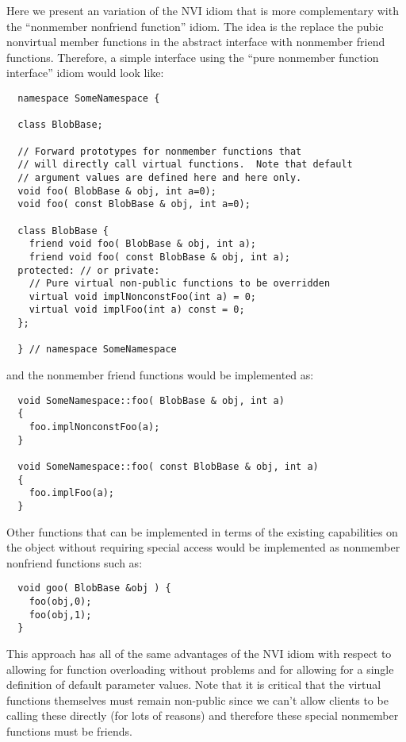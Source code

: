 \documentclass[pdf,ps2pdf,11pt]{SANDreport}
\begin{document}
Here we present an variation of the NVI idiom that is more complementary with
the ``nonmember nonfriend function'' idiom.  The idea is the replace the pubic
nonvirtual member functions in the abstract interface with nonmember friend
functions.  Therefore, a simple interface using the ``pure nonmember function
interface'' idiom would look like:

{\small\begin{verbatim}
  namespace SomeNamespace {

  class BlobBase;

  // Forward prototypes for nonmember functions that
  // will directly call virtual functions.  Note that default
  // argument values are defined here and here only.
  void foo( BlobBase & obj, int a=0);
  void foo( const BlobBase & obj, int a=0);

  class BlobBase {
    friend void foo( BlobBase & obj, int a);
    friend void foo( const BlobBase & obj, int a);
  protected: // or private:
    // Pure virtual non-public functions to be overridden
    virtual void implNonconstFoo(int a) = 0;
    virtual void implFoo(int a) const = 0;
  };

  } // namespace SomeNamespace
\end{verbatim}}

{}\noindent{}and the nonmember friend functions would be implemented as:

{\small\begin{verbatim}
  void SomeNamespace::foo( BlobBase & obj, int a)
  {
    foo.implNonconstFoo(a);
  }

  void SomeNamespace::foo( const BlobBase & obj, int a)
  {
    foo.implFoo(a);
  }
\end{verbatim}}

Other functions that can be implemented in terms of the existing capabilities
on the object without requiring special access would be implemented as
nonmember nonfriend functions such as:

{\small\begin{verbatim}
  void goo( BlobBase &obj ) {
    foo(obj,0);
    foo(obj,1);
  }
\end{verbatim}}

This approach has all of the same advantages of the NVI idiom with respect to
allowing for function overloading without problems and for allowing
for a single definition of default parameter values.  Note that it is critical
that the virtual functions themselves must remain non-public since we can't
allow clients to be calling these directly (for lots of reasons) and therefore
these special nonmember functions must be friends.
\end{document}
